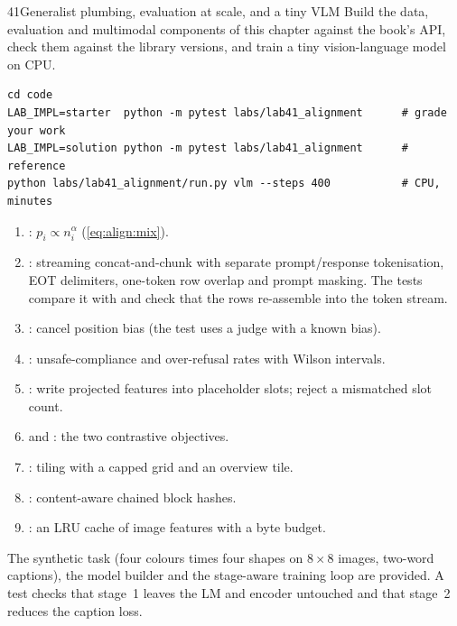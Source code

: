 \begin{labbox}{41}{Generalist plumbing, evaluation at scale, and a tiny VLM}
Build the data, evaluation and multimodal components of this chapter against the book's
 API, check them against the library versions, and train a tiny vision-language model
on CPU.

\begin{lstlisting}[style=shell]
cd code
LAB_IMPL=starter  python -m pytest labs/lab41_alignment      # grade your work
LAB_IMPL=solution python -m pytest labs/lab41_alignment      # reference
python labs/lab41_alignment/run.py vlm --steps 400           # CPU, minutes
\end{lstlisting}

\begin{enumerate}
  \item {}: $p_i\propto n_i^\alpha$ (\cref{eq:align:mix}).
  \item {}: streaming concat-and-chunk with separate prompt/response tokenisation,
        EOT delimiters, one-token row overlap and prompt masking. The tests compare it with
         and check that the rows re-assemble into the token stream.
  \item {}: cancel position bias (the test uses a judge with a known bias).
  \item {}: unsafe-compliance and over-refusal rates with Wilson intervals.
  \item {}: write projected features into placeholder slots; reject a
        mismatched slot count.
  \item {} and : the two contrastive objectives.
  \item {}: tiling with a capped grid and an overview tile.
  \item {}: content-aware chained block hashes.
  \item {}: an LRU cache of image features with a byte budget.
\end{enumerate}
The synthetic task (four colours times four shapes on $8\times8$ images, two-word captions), the model
builder and the stage-aware training loop are provided. A test checks that stage~1 leaves the LM and
encoder untouched and that stage~2 reduces the caption loss.


\end{labbox}
